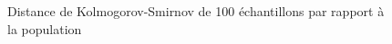 \documentclass[a4paper,11pt]{article}
\begin{document}
%
\begin{figure}[!h]
	\center
	\caption{Distance de Kolmogorov-Smirnov de 100 échantillons par rapport à la population}
	\label{fig:q2b_ks_100sample}
\end{figure}
%
\end{document}
